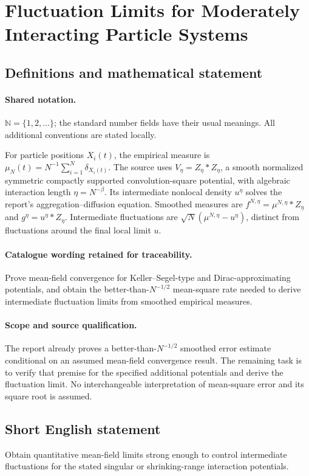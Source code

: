 \documentclass[11pt]{article}
\begin{document}
\section{Fluctuation Limits for Moderately Interacting Particle Systems}\label{statement}

\subsection{Definitions and mathematical statement}

\paragraph{Shared notation.}$\mathbb N=\{1,2,\ldots\}$; the standard number fields have their usual meanings. All additional conventions are stated locally.


For particle positions $X_i(t)$, the empirical measure is $\mu_N(t)=N^{-1}\sum_{i=1}^N\delta_{X_i(t)}$. The source uses $V_\eta=Z_\eta*Z_\eta$, a smooth normalized symmetric compactly supported convolution-square potential, with algebraic interaction length $\eta=N^{-\beta}$. Its intermediate nonlocal density $u^\eta$ solves the report's aggregation--diffusion equation. Smoothed measures are $f^{N,\eta}=\mu^{N,\eta}*Z_\eta$ and $g^\eta=u^\eta*Z_\eta$. Intermediate fluctuations are $\sqrt N(\mu^{N,\eta}-u^\eta)$, distinct from fluctuations around the final local limit $u$.

\paragraph{Catalogue wording retained for traceability.}
Prove mean-field convergence for Keller–Segel-type and Dirac-approximating potentials, and obtain the better-than-$N^{-1/2}$ mean-square rate needed to derive intermediate fluctuation limits from smoothed empirical measures.

\paragraph{Scope and source qualification.}The report already proves a better-than-$N^{-1/2}$ smoothed error estimate conditional on an assumed mean-field convergence result. The remaining task is to verify that premise for the specified additional potentials and derive the fluctuation limit. No interchangeable interpretation of mean-square error and its square root is assumed.
\subsection{Short English statement}
Obtain quantitative mean-field limits strong enough to control intermediate fluctuations for the stated singular or shrinking-range interaction potentials.
\end{document}
